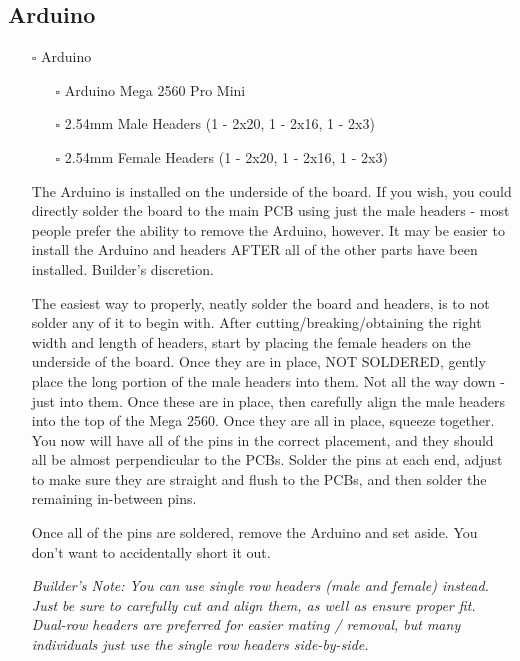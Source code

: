 \documentclass[11pt]{article}
\begin{document}
\subsection{Arduino}
\label{sec:org3b5a520}
\begin{itemize}
\item[{$\square$}] Arduino
\begin{itemize}
\item[{$\square$}] Arduino Mega 2560 Pro Mini
\item[{$\square$}] 2.54mm Male Headers (1 - 2x20, 1 - 2x16, 1 - 2x3)
\item[{$\square$}] 2.54mm Female Headers (1 - 2x20, 1 - 2x16, 1 - 2x3)
\end{itemize}

The Arduino is installed on the underside of the board.  If you wish, you could directly solder the board to the main PCB using just the male headers - most people prefer the ability to remove the Arduino, however.  It may be easier to install the Arduino and headers AFTER all of the other parts have been installed.  Builder's discretion.

The easiest way to properly, neatly solder the board and headers, is to not solder any of it to begin with.  After cutting/breaking/obtaining the right width and length of headers, start by placing the female headers on the underside of the board.  Once they are in place, NOT SOLDERED, gently place the long portion of the male headers into them.  Not all the way down - just into them.  Once these are in place, then carefully align the male headers into the top of the Mega 2560.  Once they are all in place, squeeze together.  You now will have all of the pins in the correct placement, and they should all be almost perpendicular to the PCBs.  Solder the pins at each end, adjust to make sure they are straight and flush to the PCBs, and then solder the remaining in-between pins.

Once all of the pins are soldered, remove the Arduino and set aside.  You don't want to accidentally short it out.  

\emph{Builder's Note:  You can use single row headers (male and female) instead.  Just be sure to carefully cut and align them, as well as ensure proper fit.  Dual-row headers are preferred for easier mating / removal, but many individuals just use the single row headers side-by-side.}
\end{itemize}
\end{document}
